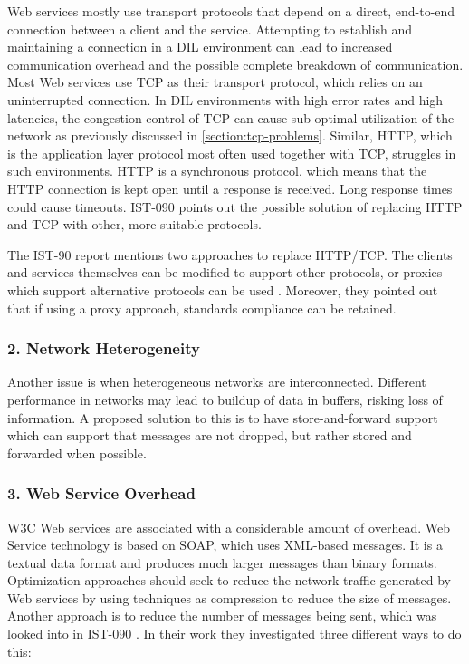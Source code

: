 Web services mostly use transport protocols that depend on a direct, end-to-end
connection between a client and the service. Attempting to establish and
maintaining a connection in a DIL environment can lead to increased communication
overhead and the possible complete breakdown of communication. Most Web services use
TCP as their transport protocol, which relies on an uninterrupted connection.
In DIL environments with high error rates and high latencies,
the congestion control of TCP can cause sub-optimal utilization of the network
as previously discussed in \cref{section:tcp-problems}. Similar, HTTP, which is
the application layer protocol most often used together with TCP, struggles in
such environments. HTTP is a synchronous protocol, which means that the HTTP
connection is kept open until a response is received. Long response times could cause
timeouts. IST-090 points out the possible solution of replacing HTTP and TCP with
other, more suitable protocols.

The IST-90 report mentions two approaches to replace HTTP/TCP. The clients and
services themselves can be modified to support other protocols, or proxies
which support alternative protocols can be used \cite{ist-090}. Moreover, they
pointed out that if using a proxy approach, standards compliance can be
retained.


\subsubsection{2. Network Heterogeneity}

Another issue is when heterogeneous networks are interconnected. Different
performance in networks may lead to buildup of data in buffers, risking loss of
information. A proposed solution to this is to have store-and-forward support
which can support that messages are not dropped, but rather stored and forwarded when
possible.


\subsubsection{3. Web Service Overhead}

W3C Web services are associated with a considerable amount of overhead. Web
Service technology is based on SOAP, which uses XML-based messages. It is a
textual data format and produces much larger messages than binary formats.
Optimization approaches should seek to reduce the network traffic generated by
Web services by using techniques as compression to reduce the size of messages.
Another approach is to reduce the number of messages being sent, which was
looked into in IST-090 \cite{ist-090}. In their work they investigated three
different ways to do this:

